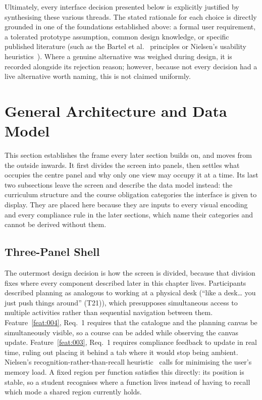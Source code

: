 Ultimately, every interface decision presented below is explicitly justified by synthesising these various threads. The stated rationale for each choice is directly grounded in one of the foundations established above: a formal user requirement, a tolerated prototype assumption, common design knowledge, or specific published literature (such as the Bartel et al.~\cite{bartel_design_2024} principles or Nielsen's usability heuristics~\cite{nielsen1994}). Where a genuine alternative was weighed during design, it is recorded alongside its rejection reason; however, because not every decision had a live alternative worth naming, this is not claimed uniformly.

\section{General Architecture and Data Model}
\label{sec:general}
This section establishes the frame every later section builds on, and moves from the outside inwards. It first divides the screen into panels, then settles what occupies the centre panel and why only one view may occupy it at a time. Its last two subsections leave the screen and describe the data model instead: the curriculum structure and the course obligation categories the interface is given to display. They are placed here because they are inputs to every visual encoding and every compliance rule in the later sections, which name their categories and cannot be derived without them.

\subsection{Three-Panel Shell}
\label{sec:three-panels}
The outermost design decision is how the screen is divided, because that division fixes where every component described later in this chapter lives. Participants described planning as analogous to working at a physical desk (\enquote{like a desk… you just push things around} (T21)), which presupposes simultaneous access to multiple activities rather than sequential navigation between them. Feature~\ref{feat:004}, Req.~1 requires that the catalogue and the planning canvas be simultaneously visible, so a course can be added while observing the canvas update. Feature~\ref{feat:003}, Req.~1 requires compliance feedback to update in real time, ruling out placing it behind a tab where it would stop being ambient. Nielsen's recognition-rather-than-recall heuristic~\cite{nielsen1994} calls for minimising the user's memory load. A fixed region per function satisfies this directly: its position is stable, so a student recognises where a function lives instead of having to recall which mode a shared region currently holds.

